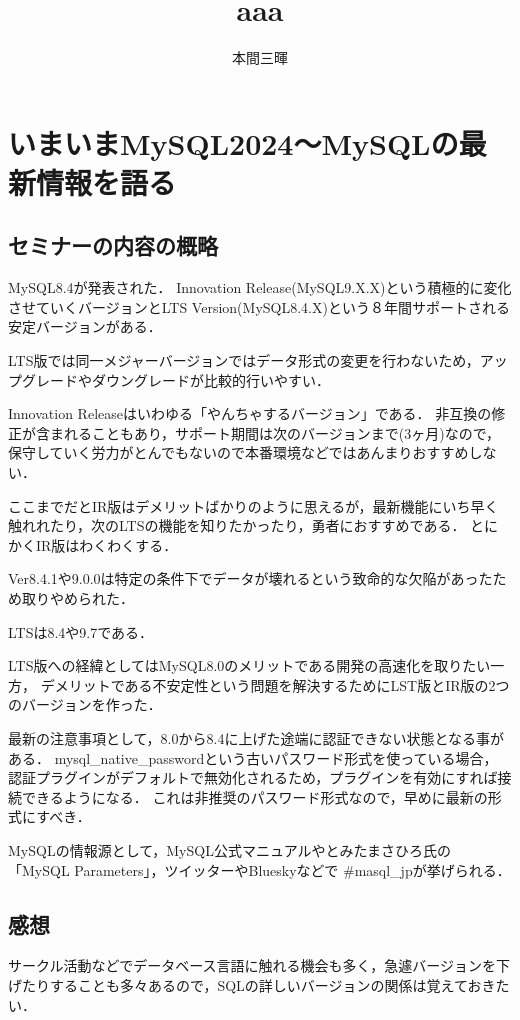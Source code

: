 \documentclass[titlepage,a4paper]{jsarticle}
\title{aaa}
\author{本間三暉}
\begin{document}
\maketitle
\section{いまいまMySQL2024〜MySQLの最新情報を語る} %
\subsection{セミナーの内容の概略}
MySQL8.4が発表された．
Innovation Release(MySQL9.X.X)という積極的に変化させていくバージョンとLTS Version(MySQL8.4.X)という８年間サポートされる安定バージョンがある．

LTS版では同一メジャーバージョンではデータ形式の変更を行わないため，アップグレードやダウングレードが比較的行いやすい．

Innovation Releaseはいわゆる「やんちゃするバージョン」である．
非互換の修正が含まれることもあり，サポート期間は次のバージョンまで(3ヶ月)なので，保守していく労力がとんでもないので本番環境などではあんまりおすすめしない．

ここまでだとIR版はデメリットばかりのように思えるが，最新機能にいち早く触れれたり，次のLTSの機能を知りたかったり，勇者におすすめである．
とにかくIR版はわくわくする．

Ver8.4.1や9.0.0は特定の条件下でデータが壊れるという致命的な欠陥があったため取りやめられた．

LTSは8.4や9.7である．

LTS版への経緯としてはMySQL8.0のメリットである開発の高速化を取りたい一方，
デメリットである不安定性という問題を解決するためにLST版とIR版の2つのバージョンを作った．

最新の注意事項として，8.0から8.4に上げた途端に認証できない状態となる事がある．
mysql\_native\_passwordという古いパスワード形式を使っている場合，
認証プラグインがデフォルトで無効化されるため，プラグインを有効にすれば接続できるようになる．
これは非推奨のパスワード形式なので，早めに最新の形式にすべき．

MySQLの情報源として，MySQL公式マニュアルやとみたまさひろ氏の「MySQL Parameters」，ツイッターやBlueskyなどで \#masql\_jpが挙げられる．
\subsection{感想}
サークル活動などでデータベース言語に触れる機会も多く，急遽バージョンを下げたりすることも多々あるので，SQLの詳しいバージョンの関係は覚えておきたい．
\end{document}
